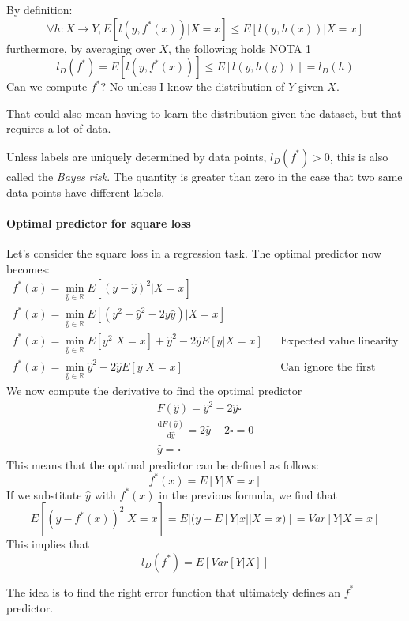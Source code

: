 By definition: 
$$\forall h : X \rightarrow Y, E[l(y, f^*(x))|X = x] \leq E[l(y, h(x))|X = x]$$
furthermore, by averaging over $X$, the following holds NOTA 1
$$l_D(f^*) = E[l(y,f^*(x))] \leq E[l(y,h(y))] = l_D(h)$$
Can we compute $f^*$? No unless I know the distribution of $Y$ given $X$. 
\begin{remark}
    That could also mean having to learn the distribution given the dataset, 
    but that requires a lot of data.
\end{remark}
Unless labels are uniquely determined by data points, $l_D(f^*) > 0$, this is also called the 
\emph{Bayes risk}.
The quantity is greater than zero in the case that two same data points have different labels.

\paragraph{Optimal predictor for square loss}
Let's consider the square loss in a regression task.
The optimal predictor now becomes: 
\begin{equation}
    \begin{aligned}
        f^*(x) = \min_{\hat{y} \in \mathbb{R}} E[(y - \hat{y})^2 | X = x]\\
        f^*(x) = \min_{\hat{y} \in \mathbb{R}} E[(y^2 + \hat{y}^2 - 2y\hat{y}) | X = x]\\
        f^*(x) = \min_{\hat{y} \in \mathbb{R}} E[y^2| X = x] + \hat{y}^2 - 2\hat{y}E[y | X = x] && \text{Expected value linearity}\\
        f^*(x) = \min_{\hat{y} \in \mathbb{R}} \hat{y}^2 - 2\hat{y}E[y | X = x] && \text{Can ignore the first}
    \end{aligned}
\end{equation}
We now compute the derivative to find the optimal predictor
\begin{equation}
    \begin{aligned}
        F(\hat{y}) = \hat{y}^2 - 2\hat{y}\square\\
        \frac{\mathrm{d}F(\hat{y})}{\mathrm{d}\hat{y}} = 2\hat{y} - 2\square = 0\\
        \hat{y} = \square
    \end{aligned}
\end{equation}
This means that the optimal predictor can be defined as follows:
$$f^*(x) = E[Y | X = x]$$
If we substitute $\hat{y}$ with $f^*(x)$ in the previous formula, we find that
$$E[(y - f^*(x))^2|X=x] = E[(y - E[Y | x] | X = x)] = \mathit{Var}[Y | X = x]$$
This implies that 
$$l_D(f^*) = E[\mathit{Var}[Y | X]]$$

\begin{remark}
    The idea is to find the right error function that ultimately 
    defines an $f^*$ predictor.
\end{remark}